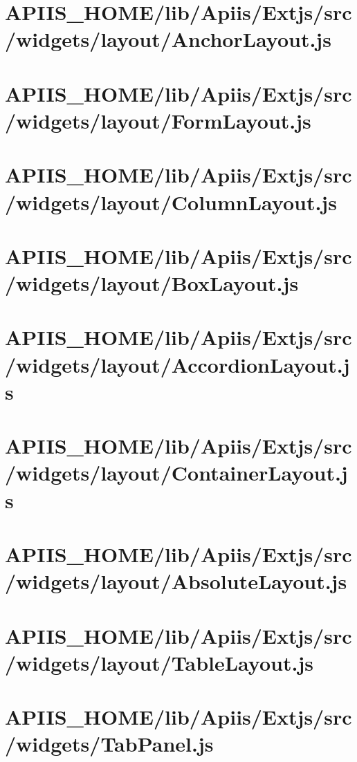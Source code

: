 \section{APIIS\_HOME/lib/Apiis/Extjs/src/widgets/layout/AnchorLayout.js} 
\section{APIIS\_HOME/lib/Apiis/Extjs/src/widgets/layout/FormLayout.js} 
\section{APIIS\_HOME/lib/Apiis/Extjs/src/widgets/layout/ColumnLayout.js} 
\section{APIIS\_HOME/lib/Apiis/Extjs/src/widgets/layout/BoxLayout.js} 
\section{APIIS\_HOME/lib/Apiis/Extjs/src/widgets/layout/AccordionLayout.js} 
\section{APIIS\_HOME/lib/Apiis/Extjs/src/widgets/layout/ContainerLayout.js} 
\section{APIIS\_HOME/lib/Apiis/Extjs/src/widgets/layout/AbsoluteLayout.js} 
\section{APIIS\_HOME/lib/Apiis/Extjs/src/widgets/layout/TableLayout.js} 
\section{APIIS\_HOME/lib/Apiis/Extjs/src/widgets/TabPanel.js} 
